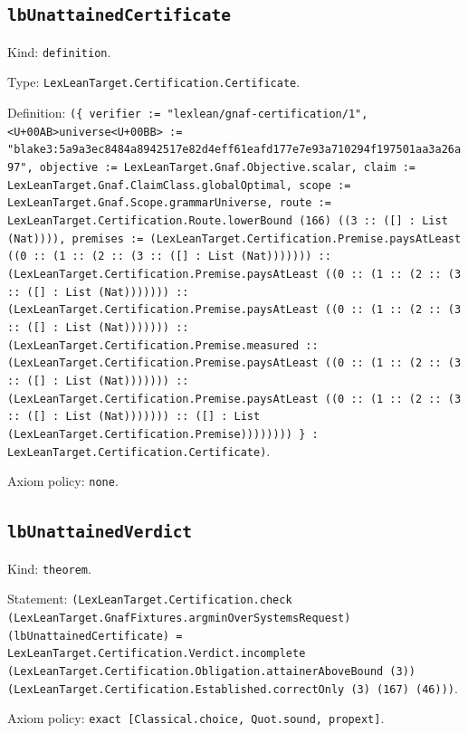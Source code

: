 \documentclass[11pt]{article}
\begin{document}
\subsection*{\texttt{lbUnattainedCertificate}}
\noindent Kind: \texttt{definition}.\par
\noindent Type: \texttt{LexLeanTarget.Certification.Certificate}.\par
\noindent Definition: \texttt{(\{ verifier := "lexlean/gnaf-certification/1", <U+00AB>universe<U+00BB> := "blake3:5a9a3ec8484a8942517e82d4eff61eafd177e7e93a710294f197501aa3a26a97", objective := LexLeanTarget.Gnaf.Objective.scalar, claim := LexLeanTarget.Gnaf.ClaimClass.globalOptimal, scope := LexLeanTarget.Gnaf.Scope.grammarUniverse, route := LexLeanTarget.Certification.Route.lowerBound (166) ((3 :: ([] : List (Nat)))), premises := (LexLeanTarget.Certification.Premise.paysAtLeast ((0 :: (1 :: (2 :: (3 :: ([] : List (Nat))))))) :: (LexLeanTarget.Certification.Premise.paysAtLeast ((0 :: (1 :: (2 :: (3 :: ([] : List (Nat))))))) :: (LexLeanTarget.Certification.Premise.paysAtLeast ((0 :: (1 :: (2 :: (3 :: ([] : List (Nat))))))) :: (LexLeanTarget.Certification.Premise.measured :: (LexLeanTarget.Certification.Premise.paysAtLeast ((0 :: (1 :: (2 :: (3 :: ([] : List (Nat))))))) :: (LexLeanTarget.Certification.Premise.paysAtLeast ((0 :: (1 :: (2 :: (3 :: ([] : List (Nat))))))) :: ([] : List (LexLeanTarget.Certification.Premise)))))))) \} : LexLeanTarget.Certification.Certificate)}.\par
\noindent Axiom policy: \texttt{none}.\par
\subsection*{\texttt{lbUnattainedVerdict}}
\noindent Kind: \texttt{theorem}.\par
\noindent Statement: \texttt{(LexLeanTarget.Certification.check (LexLeanTarget.GnafFixtures.argminOverSystemsRequest) (lbUnattainedCertificate) = LexLeanTarget.Certification.Verdict.incomplete (LexLeanTarget.Certification.Obligation.attainerAboveBound (3)) (LexLeanTarget.Certification.Established.correctOnly (3) (167) (46)))}.\par
\noindent Axiom policy: \texttt{exact [Classical.choice, Quot.sound, propext]}.\par
\end{document}
